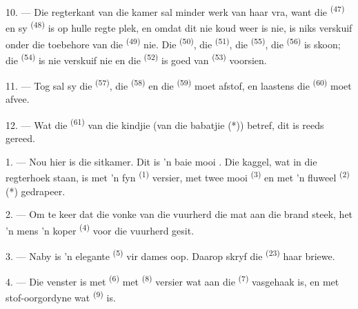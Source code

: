 10. --- Die regterkant van die kamer sal minder werk van haar vra, want die  \textsuperscript{(47)} en sy  \textsuperscript{(48)} is op
hulle regte plek, en omdat dit nie koud weer is nie, is niks verskuif onder die
toebehore van die  \textsuperscript{(49)} nie. Die 
\textsuperscript{(50)}, die  \textsuperscript{(51)}, die
 \textsuperscript{(55)}, die  \textsuperscript{(56)} is
skoon; die  \textsuperscript{(54)} is nie verskuif nie en die
 \textsuperscript{(52)} is goed van 
\textsuperscript{(53)} voorsien.



11. --- Tog sal sy die  \textsuperscript{(57)}, die
 \textsuperscript{(58)} en die 
\textsuperscript{(59)} moet afstof, en laastens die 
\textsuperscript{(60)} moet afvee.

12. --- Wat die  \textsuperscript{(61)} van die kindjie (van die babatjie
(*)) betref, dit is reeds gereed.

\VUsaut{5.0mm}
\VUsaut{3.0mm}

1. --- Nou hier is die sitkamer. Dit is 'n baie mooi . Die kaggel, wat in
die regterhoek staan, is met 'n fyn  \textsuperscript{(1)} versier, met
twee mooi  \textsuperscript{(3)} en met 'n fluweel 
\textsuperscript{(2)} (*) gedrapeer.

2. --- Om te keer dat die vonke van die vuurherd die mat aan die brand steek, het 'n
mens 'n koper  \textsuperscript{(4)} voor die vuurherd gesit.

3. --- Naby is 'n elegante  \textsuperscript{(5)} vir dames oop.
Daarop skryf die  \textsuperscript{(23)} haar briewe.

4. --- Die venster is met  \textsuperscript{(6)} met
 \textsuperscript{(8)} versier wat aan die 
\textsuperscript{(7)} vasgehaak is, en met stof-oorgordyne wat 
\textsuperscript{(9)} is.

